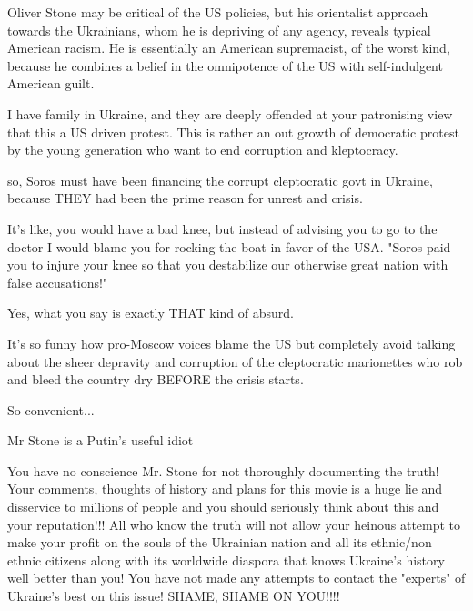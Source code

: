 \begin{itemize}

Oliver Stone may be critical of the US policies, but his orientalist approach
towards the Ukrainians, whom he is depriving of any agency, reveals typical
American racism. He is essentially an American supremacist, of the worst kind,
because he combines a belief in the omnipotence of the US with self-indulgent
American guilt.


I have family in Ukraine, and they are deeply offended at your patronising view
that this a US driven protest. This is rather an out growth of democratic
protest by the young generation who want to end corruption and kleptocracy.

\begin{itemize} %

so, Soros must have been financing the corrupt cleptocratic govt in Ukraine,
because THEY had been the prime reason for unrest and crisis.

It's like, you would have a bad knee, but instead of advising you to go to the
doctor I would blame you for rocking the boat in favor of the USA. "Soros paid
you to injure your knee so that you destabilize our otherwise great nation with
false accusations!"

Yes, what you say is exactly THAT kind of absurd.


It's so funny how pro-Moscow voices blame the US but completely avoid talking
about the sheer depravity and corruption of the cleptocratic marionettes who
rob and bleed the country dry BEFORE the crisis starts.

So convenient...
\end{itemize} %

Mr Stone is a Putin's useful idiot


You have no conscience Mr. Stone for not thoroughly documenting the truth! Your
comments, thoughts of history and plans for this movie is a huge lie and
disservice to millions of people and you should seriously think about this and
your reputation!!! All who know the truth will not allow your heinous attempt
to make your profit on the souls of the Ukrainian nation and all its ethnic/non
ethnic citizens along with its worldwide diaspora that knows Ukraine's history
well better than you! You have not made any attempts to contact the "experts"
of Ukraine's best on this issue! SHAME, SHAME ON YOU!!!!


\end{itemize}
